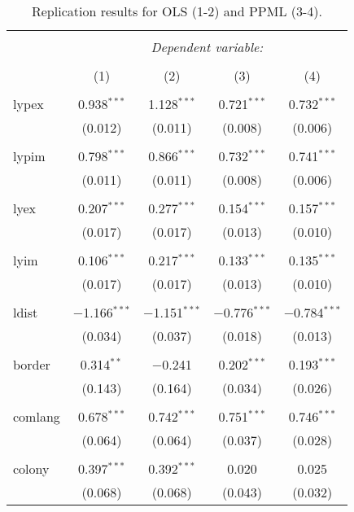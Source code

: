 \documentclass[letterpaper,twoside,12pt]{article}
\begin{document}
\begin{table}[!htbp] \centering 
  \caption{Replication results for OLS (1-2) and
  PPML (3-4).} 
  \label{} 
\footnotesize 
\begin{tabular}{@{\extracolsep{5pt}}lcccc} 
\\[-1.8ex]\hline 
\hline \\[-1.8ex] 
 & \multicolumn{4}{c}{\textit{Dependent variable:}} \\ 
\cline{2-5} 
\\[-1.8ex] & (1) & (2) & (3) & (4)\\ 
\hline \\[-1.8ex] 
 lypex & 0.938$^{***}$ & 1.128$^{***}$ & 0.721$^{***}$ & 0.732$^{***}$ \\ 
  & (0.012) & (0.011) & (0.008) & (0.006) \\ 
  & & & & \\ 
 lypim & 0.798$^{***}$ & 0.866$^{***}$ & 0.732$^{***}$ & 0.741$^{***}$ \\ 
  & (0.011) & (0.011) & (0.008) & (0.006) \\ 
  & & & & \\ 
 lyex & 0.207$^{***}$ & 0.277$^{***}$ & 0.154$^{***}$ & 0.157$^{***}$ \\ 
  & (0.017) & (0.017) & (0.013) & (0.010) \\ 
  & & & & \\ 
 lyim & 0.106$^{***}$ & 0.217$^{***}$ & 0.133$^{***}$ & 0.135$^{***}$ \\ 
  & (0.017) & (0.017) & (0.013) & (0.010) \\ 
  & & & & \\ 
 ldist & $-$1.166$^{***}$ & $-$1.151$^{***}$ & $-$0.776$^{***}$ & $-$0.784$^{***}$ \\ 
  & (0.034) & (0.037) & (0.018) & (0.013) \\ 
  & & & & \\ 
 border & 0.314$^{**}$ & $-$0.241 & 0.202$^{***}$ & 0.193$^{***}$ \\ 
  & (0.143) & (0.164) & (0.034) & (0.026) \\ 
  & & & & \\ 
 comlang & 0.678$^{***}$ & 0.742$^{***}$ & 0.751$^{***}$ & 0.746$^{***}$ \\ 
  & (0.064) & (0.064) & (0.037) & (0.028) \\ 
  & & & & \\ 
 colony & 0.397$^{***}$ & 0.392$^{***}$ & 0.020 & 0.025 \\ 
  & (0.068) & (0.068) & (0.043) & (0.032) \\ 

\end{tabular}
\end{table}
\end{document}
